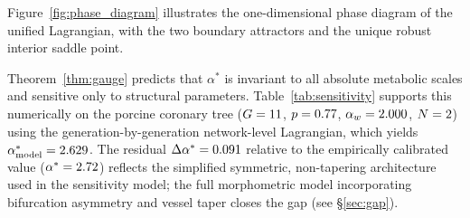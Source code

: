 Figure~\ref{fig:phase_diagram} illustrates the one-dimensional phase diagram of
the unified Lagrangian, with the two boundary attractors and the unique robust
interior saddle point.


\bigskip

\noindent Theorem~\ref{thm:gauge} predicts that $\alpha^*$ is invariant to all
absolute metabolic scales and sensitive only to structural parameters.
Table~\ref{tab:sensitivity} supports this numerically on the porcine
coronary tree ($G = 11$, $p = 0.77$, $\alpha_w = 2.000$, $N = 2$)
using the generation-by-generation network-level Lagrangian, which yields
$\alpha^*_{\mathrm{model}} = 2.629$. The residual $\Delta\alpha^* =
0.091$ relative to the empirically calibrated value ($\alpha^* =
2.72$) reflects the simplified symmetric, non-tapering architecture
used in the sensitivity model; the full morphometric model incorporating
bifurcation asymmetry and vessel taper closes the gap (see \S\ref{sec:gap}).

